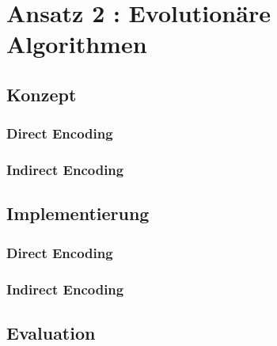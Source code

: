 \chapter{Ansatz 2 : Evolutionäre Algorithmen}
\label{GenAlgo}
\section{Konzept}
\subsection{Direct Encoding}
\subsection{Indirect Encoding}


\section{Implementierung}
\subsection{Direct Encoding}
\subsection{Indirect Encoding}

\section{Evaluation}